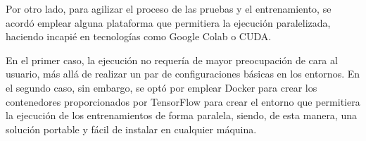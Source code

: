 Por otro lado, para agilizar el proceso de las pruebas y el entrenamiento, se acordó emplear alguna 
plataforma que permitiera la ejecución paralelizada, haciendo incapié en tecnologías como Google Colab 
o CUDA.

En el primer caso, la ejecución no requería de mayor preocupación de cara al usuario, más allá de realizar un
par de configuraciones básicas en los entornos.
En el segundo caso, sin embargo, se optó por emplear Docker para crear los contenedores proporcionados por
TensorFlow para crear el entorno que permitiera la ejecución de los entrenamientos de forma paralela, siendo, de
esta manera, una solución portable y fácil de instalar en cualquier máquina.
